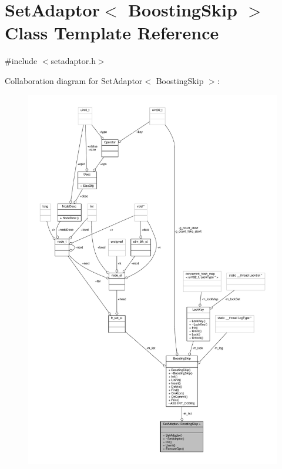 \hypertarget{classSetAdaptor_3_01BoostingSkip_01_4}{\section{Set\-Adaptor$<$ Boosting\-Skip $>$ Class Template Reference}
\label{classSetAdaptor_3_01BoostingSkip_01_4}
}


{\ttfamily \#include $<$setadaptor.\-h$>$}



Collaboration diagram for Set\-Adaptor$<$ Boosting\-Skip $>$\-:
\nopagebreak
\begin{figure}[H]
\begin{center}
\leavevmode
\includegraphics[width=350pt]{classSetAdaptor_3_01BoostingSkip_01_4__coll__graph}
\end{center}
\end{figure}
